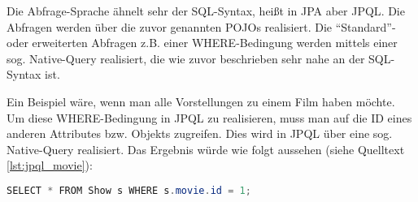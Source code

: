 Die Abfrage-Sprache ähnelt sehr der \acs{SQL}-Syntax, heißt in \ac{JPA} aber \acf{JPQL}.
Die Abfragen werden über die zuvor genannten \acsp{POJO} realisiert.
Die \enquote{Standard}- oder erweiterten Abfragen z.B. einer WHERE-Bedingung werden mittels einer sog. Native-Query realisiert, die wie zuvor beschrieben sehr nahe an der \acs{SQL}-Syntax ist.

Ein Beispiel wäre, wenn man alle Vorstellungen zu einem Film haben möchte.
Um diese WHERE-Bedingung in \acs{JPQL} zu realisieren, muss man auf die ID eines anderen Attributes bzw. Objekts zugreifen.
Dies wird in \acs{JPQL} über eine sog. Native-Query realisiert.
Das Ergebnis würde wie folgt aussehen (siehe Quelltext \vref{lst:jpql_movie}): 

\begin{lstlisting}[language=JAVA]
SELECT * FROM Show s WHERE s.movie.id = 1; 
\end{lstlisting}
\label{lst:jpql_movie}